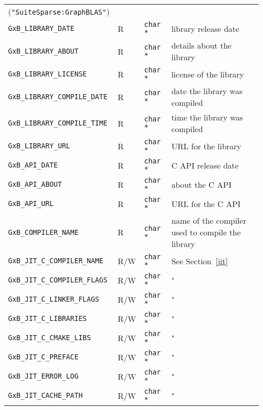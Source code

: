 {\begin{tabular}{|l|l|l|p{2.5in}|}
                                                                (\verb'"SuiteSparse:GraphBLAS"') \\
\verb'GxB_LIBRARY_DATE'             & R    & \verb'char *' & library release date \\
\verb'GxB_LIBRARY_ABOUT'            & R    & \verb'char *' & details about the library \\
\verb'GxB_LIBRARY_LICENSE'          & R    & \verb'char *' & license of the library \\
\verb'GxB_LIBRARY_COMPILE_DATE'     & R    & \verb'char *' & date the library was compiled \\
\verb'GxB_LIBRARY_COMPILE_TIME'     & R    & \verb'char *' & time the library was compiled \\
\verb'GxB_LIBRARY_URL'              & R    & \verb'char *' & URL for the library \\
\verb'GxB_API_DATE'                 & R    & \verb'char *' & C API release date \\
\verb'GxB_API_ABOUT'                & R    & \verb'char *' & about the C API \\
\verb'GxB_API_URL'                  & R    & \verb'char *' & URL for the C API \\
\verb'GxB_COMPILER_NAME'            & R    & \verb'char *' & name of the compiler used to compile the library \\
\hline
\verb'GxB_JIT_C_COMPILER_NAME'      & R/W  & \verb'char *' & See Section~\ref{jit} \\
\verb'GxB_JIT_C_COMPILER_FLAGS'     & R/W  & \verb'char *' & " \\
\verb'GxB_JIT_C_LINKER_FLAGS'       & R/W  & \verb'char *' & " \\
\verb'GxB_JIT_C_LIBRARIES'          & R/W  & \verb'char *' & " \\
\verb'GxB_JIT_C_CMAKE_LIBS'         & R/W  & \verb'char *' & " \\
\verb'GxB_JIT_C_PREFACE'            & R/W  & \verb'char *' & " \\
\verb'GxB_JIT_ERROR_LOG'            & R/W  & \verb'char *' & " \\
\verb'GxB_JIT_CACHE_PATH'           & R/W  & \verb'char *' & " \\
\hline
\end{tabular}
}

